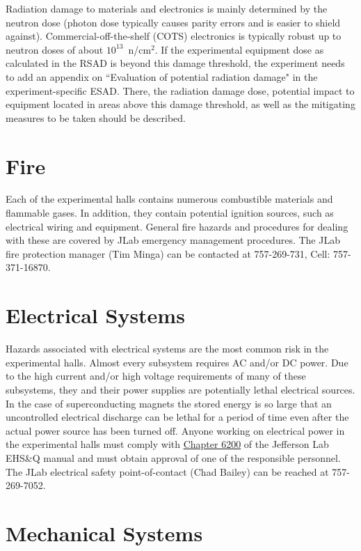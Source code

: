 \documentclass[12pt]{report}
\begin{document}
Radiation damage to materials and electronics is mainly determined by the neutron 
dose (photon dose typically causes parity errors and is easier to shield against). 
Commercial-off-the-shelf (COTS) electronics is typically robust up to neutron doses of 
about $10^{13}$~n/cm$^2$. If the experimental equipment dose as calculated in the RSAD 
is beyond this damage threshold, the experiment needs to add an appendix on ``Evaluation 
of potential radiation damage" in the experiment-specific ESAD. There, the radiation 
damage dose, potential impact to equipment located in areas above this damage threshold, 
as well as the mitigating measures to be taken should be described.

\section{Fire}

Each of the experimental halls contains numerous combustible materials and flammable gases. 
In addition, they contain potential ignition sources, such as electrical wiring and equipment. 
General fire hazards and procedures for dealing with these are covered by JLab emergency 
management procedures. The JLab fire protection manager (Tim Minga) can be contacted at 
757-269-731, Cell: 757-371-16870.

\section{Electrical Systems}

Hazards associated with electrical systems are the most common risk in the experimental 
halls. Almost every subsystem requires AC and/or DC power. Due to the high current and/or 
high voltage requirements of many of these subsystems, they and their power supplies are 
potentially lethal electrical sources. In the case of superconducting magnets the stored 
energy is so large that an uncontrolled electrical discharge can be lethal for a period of 
time even after the actual power source has been turned off. Anyone working on electrical 
power in the experimental halls must comply with 
\href{http://www.jlab.org/ehs/ehsmanual/manual/6200.html}{Chapter 6200} of the Jefferson Lab 
EHS\&Q manual and must obtain approval of one of the responsible personnel. The JLab 
electrical safety point-of-contact (Chad Bailey) can be reached at 757-269-7052.

\section{Mechanical Systems}
\end{document}
